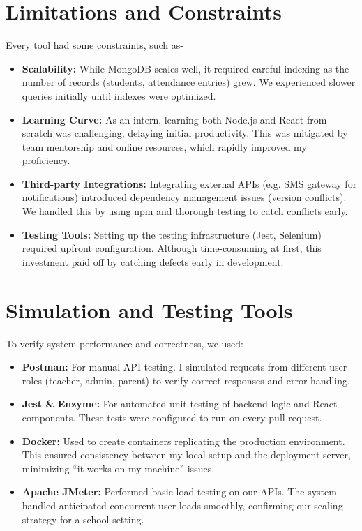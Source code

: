 \documentclass[12pt,a4paper]{report}
\newcommand{\tool}[1]{\textcolor{toolcolor}{\textbf{#1}}}
\newenvironment{coloritemize}
{\begin{itemize}[label=\textcolor{primaryblue}{$\bullet$}]}
{\end{itemize}}
\begin{document}
\section{Limitations and Constraints}
Every tool had some constraints, such as-
\begin{coloritemize}
    \item \textbf{\tool{Scalability:}} While MongoDB scales well, it required careful indexing as the number of records (students, attendance entries) grew. We experienced slower queries initially until indexes were optimized.
    \item \textbf{\tool{Learning Curve:}} As an intern, learning both Node.js and React from scratch was challenging, delaying initial productivity. This was mitigated by team mentorship and online resources, which rapidly improved my proficiency.
    \item \textbf{\tool{Third-party Integrations:}} Integrating external APIs (e.g. SMS gateway for notifications) introduced dependency management issues (version conflicts). We handled this by using npm and thorough testing to catch conflicts early.
    \item \textbf{\tool{Testing Tools:}} Setting up the testing infrastructure (Jest, Selenium) required upfront configuration. Although time-consuming at first, this investment paid off by catching defects early in development.
\end{coloritemize}

\section{Simulation and Testing Tools}
To verify system performance and correctness, we used:
\begin{coloritemize}
    \item \textbf{\tool{Postman}:} For manual API testing. I simulated requests from different user roles (teacher, admin, parent) to verify correct responses and error handling.
    \item \textbf{\tool{Jest \&}} \textbf{\tool{Enzyme}:} For automated unit testing of backend logic and React components. These tests were configured to run on every pull request.
    \item \textbf{\tool{Docker}:} Used to create containers replicating the production environment. This ensured consistency between my local setup and the deployment server, minimizing “it works on my machine” issues.
    \item \textbf{\tool{Apache JMeter}:} Performed basic load testing on our APIs. The system handled anticipated concurrent user loads smoothly, confirming our scaling strategy for a school setting.
\end{coloritemize}
\end{document}
